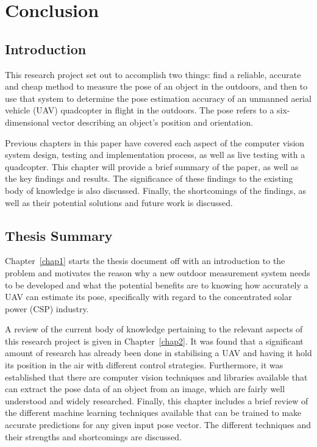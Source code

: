 \chapter{Conclusion}
\label{chap6}

\section{Introduction}

This research project set out to accomplish two things: find a reliable, accurate and cheap method to measure the pose of an object in the outdoors, and then to use that system to determine the pose estimation accuracy of an unmanned aerial vehicle (UAV) quadcopter in flight in the outdoors. The pose refers to a six-dimensional vector describing an object's position and orientation. 

Previous chapters in this paper have covered each aspect of the computer vision system design, testing and implementation process, as well as live testing with a quadcopter. This chapter will provide a brief summary of the paper, as well as the key findings and results. The significance of these findings to the existing body of knowledge is also discussed. Finally, the shortcomings of the findings, as well as their potential solutions and future work is discussed. 

\section{Thesis Summary}

Chapter~\ref{chap1} starts the thesis document off with an introduction to the problem and motivates the reason why a new outdoor measurement system needs to be developed and what the potential benefits are to knowing how accurately a UAV can estimate its pose, specifically with regard to the concentrated solar power (CSP) industry.  

A review of the current body of knowledge pertaining to the relevant aspects of this research project is given in Chapter~\ref{chap2}. It was found that a significant amount of research has already been done in stabilising a UAV and having it hold its position in the air with different control strategies. Furthermore, it was established that there are computer vision techniques and libraries available that can extract the pose data of an object from an image, which are fairly well understood and widely researched. Finally, this chapter includes a brief review of the different machine learning techniques available that can be trained to make accurate predictions for any given input pose vector. The different techniques and their strengths and shortcomings are discussed.  

